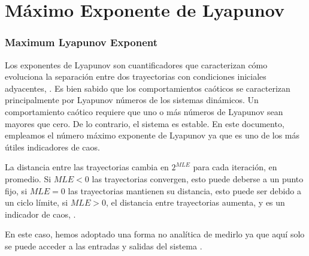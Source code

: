\section{Máximo Exponente de Lyapunov}
\label{sec:MLE}

\subsubsection{Maximum Lyapunov Exponent}

Los exponentes de Lyapunov son cuantificadores que caracterizan cómo evoluciona la separación entre dos trayectorias con condiciones iniciales adyacentes, \cite{Sprott2003}.
Es bien sabido que los comportamientos caóticos se caracterizan principalmente por Lyapunov números de los sistemas dinámicos.
Un comportamiento caótico requiere que uno o más números de Lyapunov sean mayores que cero.
De lo contrario, el sistema es estable.
En este documento, empleamos el número máximo exponente de Lyapunov ya que es uno de los más útiles indicadores de caos.

La distancia entre las trayectorias cambia en $2 ^ {MLE}$ para cada iteración, en promedio.
Si $MLE < 0$ las trayectorias convergen, esto puede deberse a un punto fijo, si $MLE = 0$ las trayectorias mantienen su distancia, esto puede ser debido a un ciclo límite, si $MLE > 0$, el distancia entre trayectorias aumenta, y es un indicador de caos, \cite{Strotgartz1994}.

En este caso, hemos adoptado una forma no analítica de medirlo ya que aquí solo se puede acceder a las entradas y salidas del sistema \cite{Sprott2003}.

